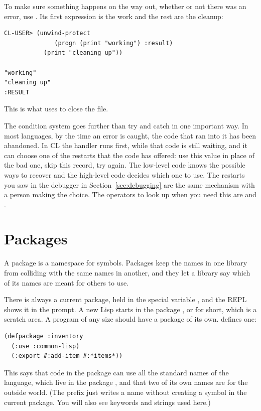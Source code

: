 To make sure something happens on the way out, whether or not there
was an error, use . Its first expression is the
work and the rest are the cleanup:

\begin{verbatim}
CL-USER> (unwind-protect
              (progn (print "working") :result)
           (print "cleaning up"))

"working"
"cleaning up"
:RESULT
\end{verbatim}

\noindent
This is what  uses to close the file.

The condition system goes further than try and catch in one important
way. In most languages, by the time an error is caught, the code that
ran into it has been abandoned. In CL the handler runs first, while
that code is still waiting, and it can choose one of the restarts that
the code has offered: use this value in place of the bad one, skip
this record, try again. The low-level code knows the possible ways to
recover and the high-level code decides which one to use. The
restarts you saw in the debugger in Section~\ref{sec:debugging} are
the same mechanism with a person making the choice. The operators to
look up when you need this are  and
.

\section{Packages}
\label{sec:packages}

A package is a namespace for symbols. Packages keep the names in one
library from colliding with the same names in another, and they let a
library say which of its names are meant for others to use.

There is always a current package, held in the special variable
, and the REPL shows it in the prompt. A new Lisp
starts in the package , or  for
short, which is a scratch area. A program of any size should have a
package of its own.  defines one:

\begin{verbatim}
(defpackage :inventory
  (:use :common-lisp)
  (:export #:add-item #:*items*))
\end{verbatim}

This says that code in the  package can use all the
standard names of the language, which live in the package
, and that two of its own names are for the outside
world. (The \code{\#:} prefix just writes a name without creating a
symbol in the current package. You will also see keywords and strings
used here.)

